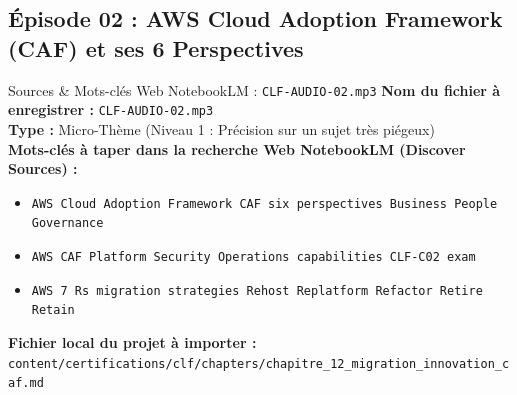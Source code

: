 \documentclass[11pt,a4paper]{article}
\begin{document}
\subsection{Épisode 02 : AWS Cloud Adoption Framework (CAF) et ses 6 Perspectives}
\begin{sourcebox}{Sources \& Mots-clés Web NotebookLM : \texttt{CLF-AUDIO-02.mp3}}
\textbf{Nom du fichier à enregistrer :} \texttt{CLF-AUDIO-02.mp3}\\
\textbf{Type :} Micro-Thème (Niveau 1 : Précision sur un sujet très piégeux)\\
\textbf{Mots-clés à taper dans la recherche Web NotebookLM (Discover Sources) :}
\begin{itemize}[noitemsep]
    \item \texttt{AWS Cloud Adoption Framework CAF six perspectives Business People Governance}
    \item \texttt{AWS CAF Platform Security Operations capabilities CLF-C02 exam}
    \item \texttt{AWS 7 Rs migration strategies Rehost Replatform Refactor Retire Retain}
\end{itemize}
\textbf{Fichier local du projet à importer :}
\texttt{content/certifications/clf/chapters/chapitre_12_migration_innovation_caf.md}
\end{sourcebox}
\end{document}

